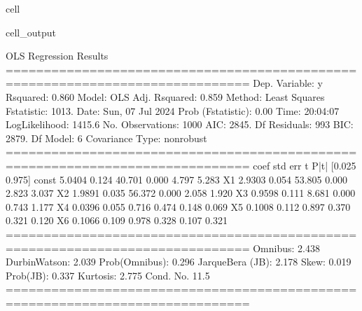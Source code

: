 \documentclass[letterpaper,10pt,english]{jupyterBook}
\begin{document}
\begin{sphinxuseclass}{cell}
\begin{sphinxVerbatimOutput}
\begin{sphinxuseclass}{cell_output}
\begin{sphinxVerbatim}[commandchars=\\\{\}]
                            OLS Regression Results                            
==============================================================================
Dep. Variable:                      y   R\PYGZhy{}squared:                       0.860
Model:                            OLS   Adj. R\PYGZhy{}squared:                  0.859
Method:                 Least Squares   F\PYGZhy{}statistic:                     1013.
Date:                Sun, 07 Jul 2024   Prob (F\PYGZhy{}statistic):               0.00
Time:                        20:04:07   Log\PYGZhy{}Likelihood:                \PYGZhy{}1415.6
No. Observations:                1000   AIC:                             2845.
Df Residuals:                     993   BIC:                             2879.
Df Model:                           6                                         
Covariance Type:            nonrobust                                         
==============================================================================
                 coef    std err          t      P\PYGZgt{}|t|      [0.025      0.975]
\PYGZhy{}\PYGZhy{}\PYGZhy{}\PYGZhy{}\PYGZhy{}\PYGZhy{}\PYGZhy{}\PYGZhy{}\PYGZhy{}\PYGZhy{}\PYGZhy{}\PYGZhy{}\PYGZhy{}\PYGZhy{}\PYGZhy{}\PYGZhy{}\PYGZhy{}\PYGZhy{}\PYGZhy{}\PYGZhy{}\PYGZhy{}\PYGZhy{}\PYGZhy{}\PYGZhy{}\PYGZhy{}\PYGZhy{}\PYGZhy{}\PYGZhy{}\PYGZhy{}\PYGZhy{}\PYGZhy{}\PYGZhy{}\PYGZhy{}\PYGZhy{}\PYGZhy{}\PYGZhy{}\PYGZhy{}\PYGZhy{}\PYGZhy{}\PYGZhy{}\PYGZhy{}\PYGZhy{}\PYGZhy{}\PYGZhy{}\PYGZhy{}\PYGZhy{}\PYGZhy{}\PYGZhy{}\PYGZhy{}\PYGZhy{}\PYGZhy{}\PYGZhy{}\PYGZhy{}\PYGZhy{}\PYGZhy{}\PYGZhy{}\PYGZhy{}\PYGZhy{}\PYGZhy{}\PYGZhy{}\PYGZhy{}\PYGZhy{}\PYGZhy{}\PYGZhy{}\PYGZhy{}\PYGZhy{}\PYGZhy{}\PYGZhy{}\PYGZhy{}\PYGZhy{}\PYGZhy{}\PYGZhy{}\PYGZhy{}\PYGZhy{}\PYGZhy{}\PYGZhy{}\PYGZhy{}\PYGZhy{}
const          5.0404      0.124     40.701      0.000       4.797       5.283
X1             2.9303      0.054     53.805      0.000       2.823       3.037
X2            \PYGZhy{}1.9891      0.035    \PYGZhy{}56.372      0.000      \PYGZhy{}2.058      \PYGZhy{}1.920
X3             0.9598      0.111      8.681      0.000       0.743       1.177
X4            \PYGZhy{}0.0396      0.055     \PYGZhy{}0.716      0.474      \PYGZhy{}0.148       0.069
X5            \PYGZhy{}0.1008      0.112     \PYGZhy{}0.897      0.370      \PYGZhy{}0.321       0.120
X6             0.1066      0.109      0.978      0.328      \PYGZhy{}0.107       0.321
==============================================================================
Omnibus:                        2.438   Durbin\PYGZhy{}Watson:                   2.039
Prob(Omnibus):                  0.296   Jarque\PYGZhy{}Bera (JB):                2.178
Skew:                           0.019   Prob(JB):                        0.337
Kurtosis:                       2.775   Cond. No.                         11.5
==============================================================================


\end{sphinxVerbatim}
\end{sphinxuseclass}
\end{sphinxVerbatimOutput}
\end{sphinxuseclass}
\end{document}

